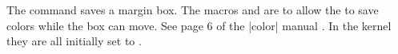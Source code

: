 %
 \begin{macro}{\@xmpar}
    \begin{teX}
\long{}
    \end{teX}
 \end{macro}
%
 \begin{macro}{\@ympar}
    \begin{teX}
\long{}
    \end{teX}
 \end{macro}
% 
 \begin{macro}{\@savemarbox}
The command saves a margin box. The macros  and  are to
allow the  to save colors while the box can move. See page 6 of the |color| manual \cite{color}. In
the kernel they are all initially set to \cmd{\relax}.
    \begin{teX}
\long{}
    \end{teX}
 \end{macro}
% 
  \begin{macro}{\@marginparreset}
%
%
    \begin{teX}
\def \@marginparreset {%
        \reset@font
        \normalsize
        \@setminipage
}
    \end{teX}
  \end{macro}
